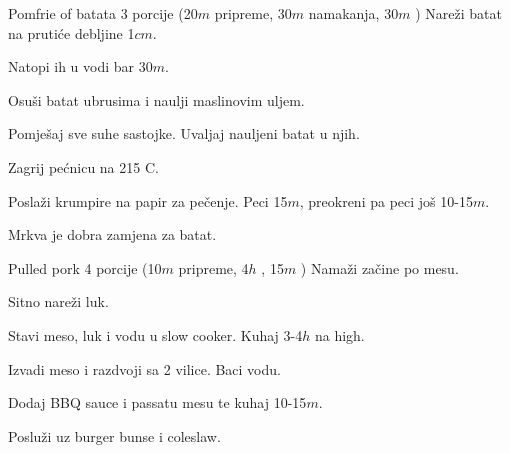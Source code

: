 \documentclass[a4paper]{article}
\begin{document}
\begin{recipe}{Pomfrie of batata}%
  {3 porcije}%
  { (20$m$ pripreme, 30$m$ namakanja, 30$m$ \oven ) \textleaf}
  Nareži batat na prutiće debljine 1$cm$.

  Natopi ih u vodi bar 30$m$.

  Osuši batat ubrusima i naulji maslinovim uljem.

  Pomješaj sve suhe sastojke. Uvaljaj nauljeni batat u njih.

\ingredient[]{}{\oven}
  Zagrij pećnicu na 215\0 C.

  Poslaži krumpire na papir za pečenje. Peci 15$m$, preokreni pa peci još
  10-15$m$.

\freeform
   Mrkva je dobra zamjena za batat.

\end{recipe}

\begin{recipe}{Pulled pork}%
  {4 porcije}%
  { (10$m$ pripreme, 4$h$ \oven, 15$m$ \fryingpan )}
  Namaži začine po mesu.

  Sitno nareži luk.

\ingredient[]{}{\pot}
  Stavi meso, luk i vodu u slow cooker. Kuhaj 3-4$h$ na high.

\newstep
  Izvadi meso i razdvoji sa 2 vilice. Baci vodu.

  Dodaj BBQ sauce i passatu mesu te kuhaj 10-15$m$.

  Posluži uz burger bunse i coleslaw.
\end{recipe}
\end{document}
